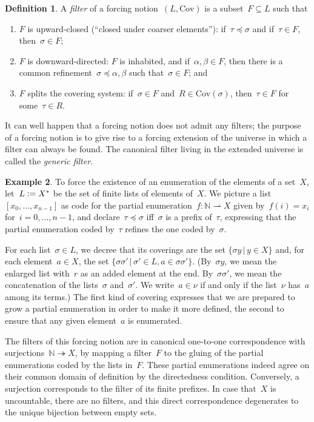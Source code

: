\documentclass[com,11pt,crcready]{iosart2x}
\theoremstyle{definition}
\newtheorem{definition}{Definition}[section]
\newtheorem{example}[definition]{Example}
\theoremstyle{plain}
\theoremstyle{remark}
\newcommand{\NN}{\mathbb{N}}
\newcommand{\defeq}{\vcentcolon=}
\newcommand{\Cov}{\mathrm{Cov}}
\renewcommand{\_}{\mathpunct{.}\,}
\begin{document}
\begin{definition}A \emph{filter} of a forcing notion~$(L,\mathrm{Cov})$
is a subset~$F \subseteq L$ such that
\begin{enumerate}
\item $F$ is upward-closed (``closed under coarser elements''): if~$\tau \preceq \sigma$ and if~$\tau \in F$,
then~$\sigma \in F$;
\item $F$ is downward-directed: $F$ is inhabited, and if~$\alpha,\beta \in F$,
then there is a common refinement~$\sigma \preceq \alpha,\beta$ such
that~$\sigma \in F$; and
\item $F$ splits the covering system: if~$\sigma \in F$ and~$R \in
\Cov(\sigma)$, then~$\tau \in F$ for some~$\tau \in R$.
\end{enumerate}
\end{definition}

It can well happen that a forcing notion does not admit any filters; the
purpose of a forcing notion is to give rise to a forcing extension of the
universe in which a filter can always be found. The canonical filter living in
the extended universe is called the \emph{generic filter}.

\begin{example}\label{ex:notion-enum}To force the existence of an enumeration
of the elements of a set~$X$, let~$L \defeq X^*$ be the set of finite lists
of elements of~$X$. We picture a list~$[x_0,\ldots,x_{n-1}]$ as code for the
partial enumeration~$f : \NN \rightharpoonup X$ given by~$f(i) = x_i$
for~$i=0,\ldots,n-1$, and declare~$\tau \preceq \sigma$ iff~$\sigma$ is a prefix
of~$\tau$, expressing that the partial enumeration coded by~$\tau$ refines the
one coded by~$\sigma$.

For each list~$\sigma \in L$, we decree that its coverings are the set
$\{ \sigma y \,|\, y \in X \}$
and, for each element~$a \in X$, the set
$\{ \sigma \sigma' \,|\, \sigma' \in L, a \in \sigma \sigma'
\}$. (By~$\sigma y$, we mean the enlarged list with~$r$ as an
added element at the end. By~$\sigma \sigma'$, we mean the concatenation
of the lists~$\sigma$ and~$\sigma'$. We write~$a \in \nu$ if and only if the
list~$\nu$ has~$a$ among its terms.)
The first kind of covering expresses that we are prepared to grow a partial
enumeration in order to make it more defined, the second to ensure
that any given element~$a$ is enumerated.

The filters of this forcing notion
are in canonical one-to-one correspondence with
surjections~$\NN \twoheadrightarrow X$, by mapping a filter~$F$ to the gluing
of the partial enumerations coded by the lists in~$F$. These partial
enumerations indeed agree on their common domain of definition by the
directedness condition. Conversely, a surjection corresponds to the filter of
its finite prefixes. In case that~$X$ is uncountable, there are no filters, and
this direct correspondence degenerates to the unique bijection between
empty sets.
\end{example}
\end{document}
